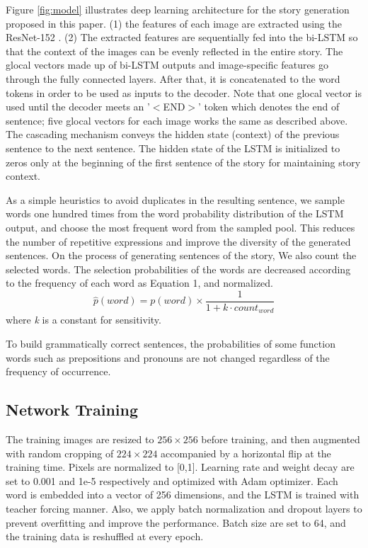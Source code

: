 \documentclass[11pt,a4paper]{article}
\begin{document}
Figure \ref{fig:model} illustrates deep learning architecture for the story generation proposed in this paper. 
(1) the features of each image are extracted using the ResNet-152 \cite{he2015resnet}. 
(2) The extracted features are sequentially fed into the bi-LSTM so that the context of the images can be evenly reflected in the entire story.
The glocal vectors made up of bi-LSTM outputs and image-specific features go through the fully connected layers. After that, it is concatenated to the word tokens in order to be used as inputs to the decoder.
Note that one glocal vector is used until the decoder meets an '$<$END$>$' token which denotes the end of sentence;
five glocal vectors for each image works the same as described above.
The cascading mechanism conveys the hidden state (context) of the previous sentence to the next sentence. 
The hidden state of the LSTM is initialized to zeros only at the beginning of the first sentence of the story for maintaining story context.

As a simple heuristics to avoid duplicates in the resulting sentence, we sample words one hundred times from the word probability distribution of the LSTM output, and choose the most frequent word from the sampled pool.
This reduces the number of repetitive expressions and improve the diversity of the generated sentences.
On the process of generating sentences of the story, We also count the selected words.
The selection probabilities of the words are decreased according to the frequency of each word as Equation 1, and normalized.
\begin{equation}
\hat{p}(word)=p(word) \times \frac{1}{1 + k \cdot count_{word}}
\end{equation}
where \textit{k} is a constant for sensitivity.

To build grammatically correct sentences, the probabilities of some function words such as prepositions and pronouns are not changed regardless of the frequency of occurrence.

\subsection{Network Training}
The training images are resized to $256 \times 256$ before training, and then augmented with random cropping of $224 \times 224$ accompanied by a horizontal flip at the training time. 
Pixels are normalized to [0,1]. 
Learning rate and weight decay are set to 0.001 and 1e-5 respectively and optimized with Adam optimizer. 
Each word is embedded into a vector of 256 dimensions, and the LSTM is trained with teacher forcing manner. 
Also, we apply batch normalization and dropout layers to prevent overfitting and improve the performance. 
Batch size are set to 64, and the training data is reshuffled at every epoch.
\end{document}
